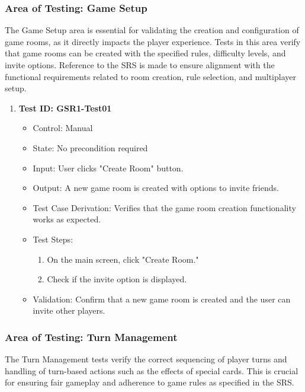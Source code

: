 \documentclass[12pt, titlepage]{article}
\begin{document}
\subsubsection{Area of Testing: Game Setup}

The Game Setup area is essential for validating the creation and configuration of game rooms, as it directly impacts the player experience. Tests in this area verify that game rooms can be created with the specified rules, difficulty levels, and invite options. Reference to the SRS is made to ensure alignment with the functional requirements related to room creation, rule selection, and multiplayer setup.

\begin{enumerate}
    \item \textbf{Test ID: GSR1-Test01}
        \begin{itemize}
            \item Control: Manual
            \item State: No precondition required
            \item Input: User clicks "Create Room" button.
            \item Output: A new game room is created with options to invite friends.
            \item Test Case Derivation: Verifies that the game room creation functionality works as expected.
            \item Test Steps:
                \begin{enumerate}
                    \item On the main screen, click "Create Room."
                    \item Check if the invite option is displayed.
                \end{enumerate}
            \item Validation: Confirm that a new game room is created and the user can invite other players.
        \end{itemize}
\end{enumerate}


\subsubsection{Area of Testing: Turn Management}

The Turn Management tests verify the correct sequencing of player turns and handling of turn-based actions such as the effects of special cards. This is crucial for ensuring fair gameplay and adherence to game rules as specified in the SRS.
\end{document}
